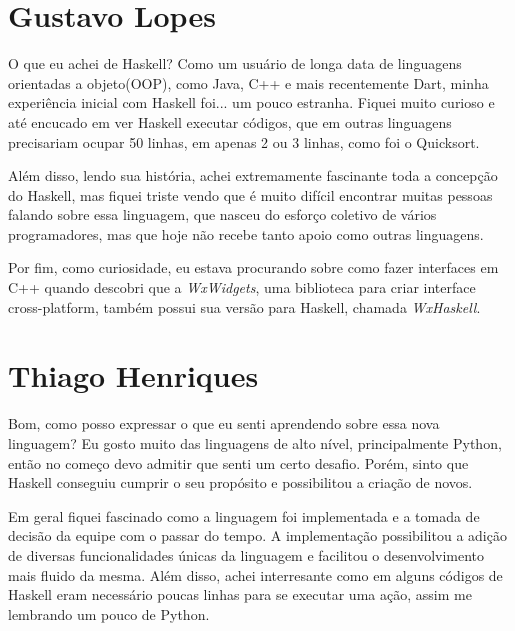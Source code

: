 \begin{apendicesenv}
      
    \partapendices

    \setcounter{chapter}{0}
    \renewcommand{\thechapter}{\Alph{chapter}}%

    \chapter{Gustavo Lopes}

    O que eu achei de Haskell? Como um usuário de longa data de linguagens orientadas a objeto(OOP), 
    como Java, C++ e mais recentemente Dart, minha experiência inicial com Haskell foi...
    um pouco estranha. Fiquei muito curioso e até encucado em ver Haskell executar códigos, que em
    outras linguagens precisariam ocupar 50 linhas, em apenas 2 ou 3 linhas, como foi o Quicksort.

    Além disso, lendo sua história, achei extremamente fascinante toda a concepção do Haskell,
    mas fiquei triste vendo que é muito difícil encontrar muitas pessoas falando sobre essa linguagem, que nasceu 
    do esforço coletivo de vários programadores, mas que hoje não recebe tanto apoio como outras linguagens.

    Por fim, como curiosidade, eu estava procurando sobre como fazer interfaces em C++ quando
    descobri que a \emph{WxWidgets}, uma biblioteca para criar interface cross-platform, também possui 
    sua versão para Haskell, chamada \emph{WxHaskell}.

    \newpage

    \chapter{Thiago Henriques}
    
    Bom, como posso expressar o que eu senti aprendendo sobre essa nova linguagem? Eu gosto muito das linguagens de alto nível, principalmente Python,
    então no começo devo admitir que senti um certo desafio. Porém, sinto que Haskell conseguiu cumprir o 
    seu propósito e possibilitou a criação de novos.

    Em geral fiquei fascinado como a linguagem foi implementada e a tomada de decisão da equipe com o passar do tempo. A implementação
    possibilitou a adição de diversas funcionalidades únicas da linguagem e facilitou o desenvolvimento mais fluido da mesma.
    Além disso, achei interresante como em alguns códigos de Haskell eram necessário poucas linhas para se executar uma ação, assim
    me lembrando um pouco de Python.


\end{apendicesenv}
